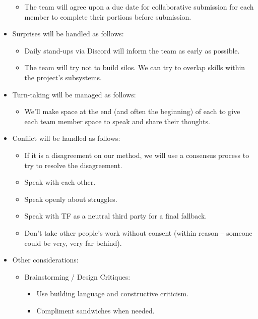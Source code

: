 \begin{itemize}
\begin{itemize}
        \item The team will agree upon a due date for collaborative submission for each member to complete their portions before submission.
    \end{itemize}
    \item Surprises will be handled as follows:
    \begin{itemize}
        \item Daily stand-ups via Discord will inform the team as early as possible.
        \item The team will try not to build silos. We can try to overlap skills within the project’s subsystems.
    \end{itemize}
    \item Turn-taking will be managed as follows:
    \begin{itemize}
        \item We’ll make space at the end (and often the beginning) of each to give each team member space to speak and share their thoughts.
    \end{itemize}
    \item Conflict will be handled as follows:
    \begin{itemize}
        \item If it is a disagreement on our method, we will use a consensus process to try to resolve the disagreement.
        \item Speak with each other.
        \item Speak openly about struggles.
        \item Speak with TF as a neutral third party for a final fallback.
        \item Don’t take other people’s work without consent (within reason – someone could be very, very far behind).
    \end{itemize}
    \item Other considerations:
    \begin{itemize}
        \item Brainstorming / Design Critiques:
        \begin{itemize}
            \item Use building language and constructive criticism.
            \item Compliment sandwiches when needed.
        \end{itemize}
    \end{itemize}
\end{itemize}
